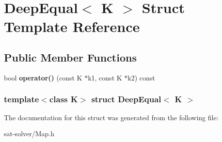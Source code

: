 \hypertarget{structDeepEqual}{\section{\-Deep\-Equal$<$ \-K $>$ \-Struct \-Template \-Reference}
\label{structDeepEqual}
}
\subsection*{\-Public \-Member \-Functions}
\begin{DoxyCompactItemize}
\item 
\hypertarget{structDeepEqual_ab33997826e0182fea574f49221e87342}{bool {\bfseries operator()} (const \-K $\ast$k1, const \-K $\ast$k2) const }\label{structDeepEqual_ab33997826e0182fea574f49221e87342}

\end{DoxyCompactItemize}
\subsubsection*{template$<$class K$>$ struct Deep\-Equal$<$ K $>$}



\-The documentation for this struct was generated from the following file\-:\begin{DoxyCompactItemize}
\item 
sat-\/solver/\-Map.\-h\end{DoxyCompactItemize}

